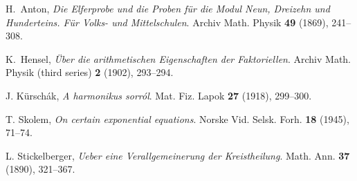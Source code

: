 \renewcommand\refname{\normalsize References}
\let\oldaddcontentsline\addcontentsline
\renewcommand{\addcontentsline}[3]{}
\begin{thebibliography}{11}
 H.~Anton, \emph{Die Elferprobe und die Proben für die Modul Neun, Dreizehn und Hunderteins.  Für Volks- und Mittelschulen}. Archiv Math. Physik \textbf{49} (1869), 241--308.

 K.~Hensel, \emph{Über die arithmetischen Eigenschaften der Faktoriellen}. Archiv Math. Physik (third series) \textbf{2} (1902), 293--294.

J. Kürschák, \emph{A harmonikus sorról}. Mat. Fiz. Lapok \textbf{27} (1918), 299--300. 

T. Skolem, \emph{On certain exponential equations}.
Norske Vid. Selsk. Forh. \textbf{18} (1945), 71--74.

L. Stickelberger, \emph{Ueber eine Verallgemeinerung der Kreistheilung}. Math. Ann. \textbf{37} (1890), 321--367.



\end{thebibliography}
\let\addcontentsline\oldaddcontentsline



